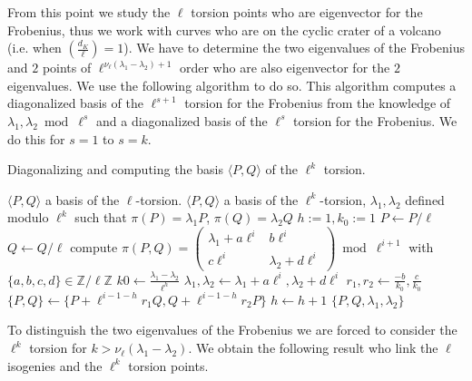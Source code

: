 \documentclass{article}
\theoremstyle{plain}
\theoremstyle{definition}
\theoremstyle{remark}
\begin{document}
From this point we study the $\ell$ torsion points who are eigenvector for the Frobenius, thus we work with curves who are on the cyclic crater of a volcano (i.e. when $\left( \frac{d_K}{\ell} \right)=1$). We have to determine  the two eigenvalues of the Frobenius and $2$ points of $\ell^{\nu_{\ell}(\lambda_1-\lambda_2)+1}$ order who are also eigenvector for the $2$ eigenvalues. We use the following algorithm to do so. This algorithm computes a diagonalized basis of the $\ell^{s+1}$ torsion for the Frobenius from the knowledge of $\lambda_1, \lambda_2 \bmod \ell^s$ and a diagonalized basis of the $\ell^s$ torsion for the Frobenius. We do this for $s=1$ to $s=k$.
\begin{algorithm}
\caption{\label{Diagnoalizedbasis}Diagonalizing and computing the basis $\langle P,Q \rangle $ of the $\ell^k$ torsion.}
\begin{algorithmic}[5]
\REQUIRE $\langle P,Q \rangle$ a basis of the $\ell$-torsion.
\ENSURE $\langle P,Q \rangle$ a basis of the $\ell^k$-torsion, $\lambda_1, \lambda_2$ defined modulo $\ell^k$ such that $\pi(P)=\lambda_1P$, $ \pi(Q)=\lambda_2Q$
\STATE $h:=1, k_0:=1$
\STATE $P \leftarrow P/\ell$
\STATE $Q \leftarrow Q/\ell$ 
\STATE compute $\pi(P,Q)=\left( \begin{array}{cc}
\lambda_1 + a\ell^{i} & b\ell^{i}\\
c\ell^{i} & \lambda_2 + d\ell^{i}
\end{array} \right) \bmod \ell^{i+1}$ with $\{a,b,c,d\} \in \mathbb{Z}/\ell\mathbb{Z}$
\STATE $k0 \leftarrow \frac{\lambda_1-\lambda_2}{\ell^h}$
\ENDIF
\STATE $\lambda_1, \lambda_2  \gets \lambda_1 + a\ell^i, \lambda_2 + d\ell^i$
\STATE $r_1,r_2 \gets \frac{-b }{k_0}, \frac{c }{k_0}$  
\STATE $\{P,Q\} \gets \{P+\ell^{i-1-h}r_1Q,Q+\ell^{i-1-h}r_2P\}$
\STATE $h \leftarrow h+1$
\ENDIF
\ENDFOR
\RETURN $\{P,Q,\lambda_1,\lambda_2\}$
\end{algorithmic}
\end{algorithm}


To distinguish the two eigenvalues of the Frobenius we are forced to consider the $\ell^k$ torsion for $k>\nu_{\ell}(\lambda_1-\lambda_2)$. We obtain the following result who link the $\ell$ isogenies and the $\ell^k$ torsion points.
\end{document}
